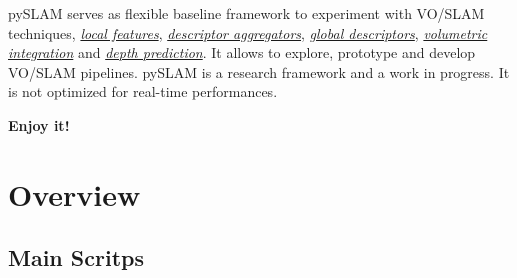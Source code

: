 \documentclass{article}
\begin{document}
pySLAM serves as flexible baseline framework to experiment with VO/SLAM
techniques, \emph{\protect\hyperlink{supported-local-features}{local
features}},
\emph{\protect\hyperlink{supported-global-descriptors-and-local-descriptor-aggregation-methods}{descriptor
aggregators}},
\emph{\protect\hyperlink{supported-global-descriptors-and-local-descriptor-aggregation-methods}{global
descriptors}},
\emph{\protect\hyperlink{volumetric-reconstruction-pipeline}{volumetric
integration}} and \emph{\protect\hyperlink{depth-prediction}{depth
prediction}}. It allows to explore, prototype and develop VO/SLAM
pipelines. pySLAM is a research framework and a work in progress. It is
not optimized for real-time performances.

\textbf{Enjoy it!}


\hypertarget{system_overview}{%
\section{Overview}}

\subsection{Main Scritps}
\end{document}
